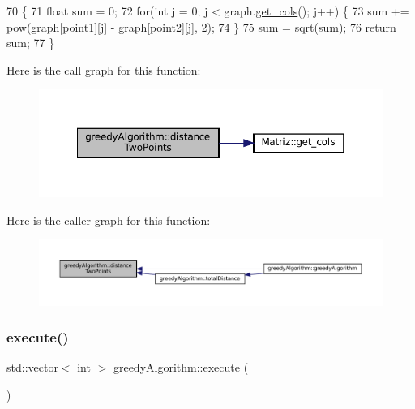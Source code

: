 \begin{DoxyCode}
70                                                                \{
71   \textcolor{keywordtype}{float} sum = 0; 
72   \textcolor{keywordflow}{for}(\textcolor{keywordtype}{int} j = 0; j < graph.\hyperlink{classMatriz_ad6915f9b31f93230a3ce05d01d23a47b}{get\_cols}(); j++) \{
73     sum += pow(graph[point1][j] - graph[point2][j], 2);
74   \}
75   sum = sqrt(sum);
76   \textcolor{keywordflow}{return} sum;
77 \}
\end{DoxyCode}
Here is the call graph for this function\+:
\nopagebreak
\begin{figure}[H]
\begin{center}
\leavevmode
\includegraphics[width=350pt]{classgreedyAlgorithm_a59dd977d1c232276b8494de999e415d4_cgraph}
\end{center}
\end{figure}
Here is the caller graph for this function\+:
\nopagebreak
\begin{figure}[H]
\begin{center}
\leavevmode
\includegraphics[width=350pt]{classgreedyAlgorithm_a59dd977d1c232276b8494de999e415d4_icgraph}
\end{center}
\end{figure}
\mbox{\label{classgreedyAlgorithm_a37c81600b24a32ae25b6f0eeab643a7a}} 
\subsubsection{\texorpdfstring{execute()}{execute()}}
{\footnotesize\ttfamily std\+::vector$<$ int $>$ greedy\+Algorithm\+::execute (\begin{DoxyParamCaption}{ }\end{DoxyParamCaption})\hspace{0.3cm}{\ttfamily [virtual]}}



